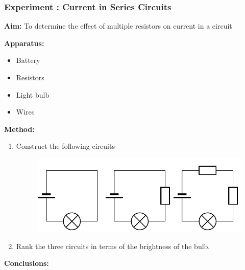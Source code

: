           
\label{m38776*eip-186}
            \subsubsection{ Experiment : Current in Series Circuits}
            \nopagebreak
            \label{m38776*id66871}\noindent{}\textbf{Aim:}
          To determine the effect of multiple resistors on current in a circuit\par 
        \label{m38776*id66886}\noindent{}\textbf{Apparatus:}
          
        \label{m38776*id66895}\begin{itemize}[noitemsep]
            \label{m38776*uid49}\item Battery
\label{m38776*uid50}\item Resistors
\label{m38776*uid51}\item Light bulb
\label{m38776*uid52}\item Wires
\end{itemize}
        \par 
        \label{m38776*id66948}\noindent{}\textbf{Method:}
          
        \label{m38776*id66957}\begin{enumerate}[noitemsep, label=\textbf{\arabic*}. ] 
            \label{m38776*uid53}\item Construct the following circuits

    \setcounter{subfigure}{0}


	\begin{figure}[H] %
    \begin{center}
    \label{m38776*id66976!!!underscore!!!media}\label{m38776*id66976!!!underscore!!!printimage}\includegraphics[width=\columnwidth]{col11305.imgs/m38776_PG10C9_027.png} %
        
      \vspace{2pt}
    \vspace{.1in}
    
    \end{center}

 \end{figure}   

    \addtocounter{footnote}{-0}
    \label{m38776*uid54}\item Rank the three circuits in terms of the brightness of the bulb.
\end{enumerate}
        \par 
        \label{m38776*id66996}\noindent{}\textbf{Conclusions:}
          
